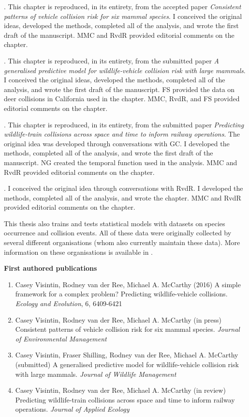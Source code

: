 \documentclass[titlesmallcaps,copyrightpage,examinerscopy]{uomthesis}
\begin{document}
. This chapter is reproduced, in its entirety, from the accepted paper \textit{Consistent patterns of vehicle collision risk for six mammal species}. I conceived the original ideas, developed the methods, completed all of the analysis, and wrote the first draft of the manuscript. MMC and RvdR provided editorial comments on the chapter.

. This chapter is reproduced, in its entirety, from the submitted paper \textit{A generalised predictive model for wildlife-vehicle collision risk with large mammals}. I conceived the original ideas, developed the methods, completed all of the analysis, and wrote the first draft of the manuscript. FS provided the data on deer collisions in California used in the chapter. MMC, RvdR, and FS provided editorial comments on the chapter.

. This chapter is reproduced, in its entirety, from the submitted paper \textit{Predicting wildlife-train collisions across space and time to inform railway operations}. The original idea was developed through conversations with GC. I developed the methods, completed all of the analysis, and wrote the first draft of the manuscript. NG created the temporal function used in the analysis. MMC and RvdR provided editorial comments on the chapter.

. I conceived the original idea through conversations with RvdR. I developed the methods, completed all of the analysis, and wrote the chapter. MMC and RvdR provided editorial comments on the chapter.

This thesis also trains and tests statistical models with datasets on species occurrence and collision events. All of these data were originally collected by several different organisations (whom also currently maintain these data). More information on these organisations is available in .

\newpage
\textbf{First authored publications}
\begin{enumerate}
\item Casey Visintin, Rodney van der Ree, Michael A. McCarthy (2016) A simple framework for a complex problem?  Predicting wildlife-vehicle collisions. \textit{Ecology and Evolution}, 6, 6409-6421

\item Casey Visintin, Rodney van der Ree, Michael A. McCarthy (in press) Consistent patterns of vehicle collision risk for six mammal species. \textit{Journal of Environmental Management}

\item Casey Visintin, Fraser Shilling, Rodney van der Ree, Michael A. McCarthy (submitted) A generalised predictive model for wildlife-vehicle collision risk with large mammals. \textit{Journal of Wildlife Management}

\item Casey Visintin, Rodney van der Ree, Michael A. McCarthy (in review) Predicting wildlife-train collisions across space and time to inform railway operations. \textit{Journal of Applied Ecology}
\end{enumerate}
\end{document}
